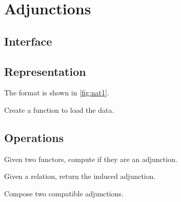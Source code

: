 
\section{Adjunctions}

\subsection*{Interface}

\subsection*{Representation}

The format is shown in \cref{fig:nat1}.



\begin{gradedexercise}
  Create a function to load the data.

%
\end{gradedexercise}

\subsection{Operations}
\begin{gradedexercise}
  Given two functors, compute if they are an adjunction.

\end{gradedexercise}

\begin{gradedexercise}
  Given a relation, return the induced adjunction.
\end{gradedexercise}


\begin{gradedexercise}
  Compose two compatible adjunctions.
\end{gradedexercise}
